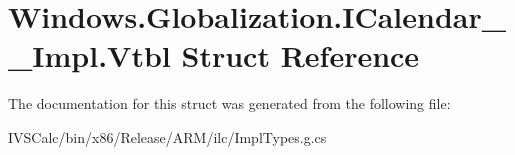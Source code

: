 \hypertarget{struct_windows_1_1_globalization_1_1_i_calendar_____impl_1_1_vtbl}{}\section{Windows.\+Globalization.\+I\+Calendar\+\_\+\+\_\+\+Impl.\+Vtbl Struct Reference}
\label{struct_windows_1_1_globalization_1_1_i_calendar_____impl_1_1_vtbl}


The documentation for this struct was generated from the following file\+:\begin{DoxyCompactItemize}
\item 
I\+V\+S\+Calc/bin/x86/\+Release/\+A\+R\+M/ilc/Impl\+Types.\+g.\+cs\end{DoxyCompactItemize}

